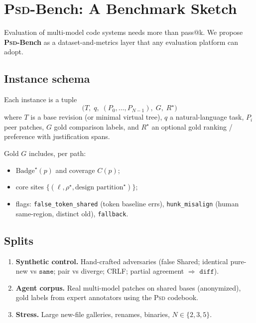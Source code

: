 \documentclass[
  11pt,
  a4paper,
  oneside,
  numbers=noenddot,
  abstract=true,
  headings=normal,
  DIV=11,
  BCOR=0mm,
]{scrartcl}
\theoremstyle{definition}
\theoremstyle{plain}
\theoremstyle{remark}
\newcommand{\PSD}{\textsc{Psd}}
\newcommand{\badge}[1]{\texttt{#1}}
\newcommand{\Badge}{\mathrm{Badge}}
\begin{document}
\section{\PSD{}-Bench: A Benchmark Sketch}
\label{sec:bench}

Evaluation of multi-model code systems needs more than pass@k. We propose
\textbf{\PSD{}-Bench} as a dataset-and-metrics layer that any evaluation
platform can adopt.

\subsection{Instance schema}

Each instance is a tuple
\[
  \bigl(T,\; q,\; (P_0,\ldots,P_{N-1}),\; G,\; R^\star\bigr)
\]
where $T$ is a base revision (or minimal virtual tree), $q$ a natural-language
task, $P_i$ peer patches, $G$ gold comparison labels, and $R^\star$ an optional
gold ranking / preference with justification spans.

Gold $G$ includes, per path:
\begin{itemize}
  \item $\Badge^\star(p)$ and coverage $C(p)$;
  \item core sites $\{(\ell,\rho^\star,\text{design partition}^\star)\}$;
  \item flags: \texttt{false\_token\_shared} (token baseline errs),
        \texttt{hunk\_misalign} (human same-region, distinct $\mathrm{old}$),
        \texttt{fallback}.
\end{itemize}

\subsection{Splits}

\begin{enumerate}
  \item \textbf{Synthetic control.} Hand-crafted adversaries (false Shared;
        identical pure-new vs $\badge{same}$; pair vs diverge; CRLF; partial
        agreement $\Rightarrow$ $\badge{diff}$).
  \item \textbf{Agent corpus.} Real multi-model patches on shared bases
        (anonymized), gold labels from expert annotators using the \PSD{}
        codebook.
  \item \textbf{Stress.} Large new-file galleries, renames, binaries,
        $N\in\{2,3,5\}$.
\end{enumerate}
\end{document}
